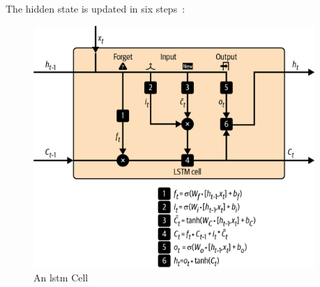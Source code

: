 The hidden state is updated in six steps~:

\begin{figure}
	\begin{center}
		\includegraphics[width=0.95\textwidth]{figures/lstm_cell}
	\end{center}
	\caption{An \gls{lstm} Cell}\label{fig:lstm_cell}
\end{figure}


